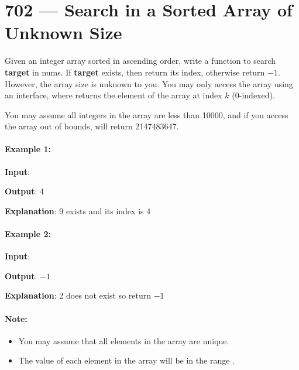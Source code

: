\section{702 --- Search in a Sorted Array of Unknown Size}
Given an integer array sorted in ascending order, write a function to search \textbf{target} in nums.  If \textbf{target} exists, then return its index, otherwise return $-1$. However, the array size is unknown to you. You may only access the array using an  interface, where  returns the element of the array at index $k$ (0-indexed).

You may assume all integers in the array are less than 10000, and if you access the array out of bounds,  will return 2147483647.

\paragraph{Example 1:}

\begin{flushleft}
\textbf{Input}: 

\textbf{Output}: 4

\textbf{Explanation}: 9 exists and its index is 4
\end{flushleft}

\paragraph{Example 2:}

\begin{flushleft}
\textbf{Input}: 

\textbf{Output}: $-1$

\textbf{Explanation}: 2 does not exist so return $-1$
\end{flushleft}

 

\paragraph{Note:}

\begin{itemize}
\item You may assume that all elements in the array are unique.
\item The value of each element in the array will be in the range \fcj{[-9999, 9999]}.
\end{itemize}

